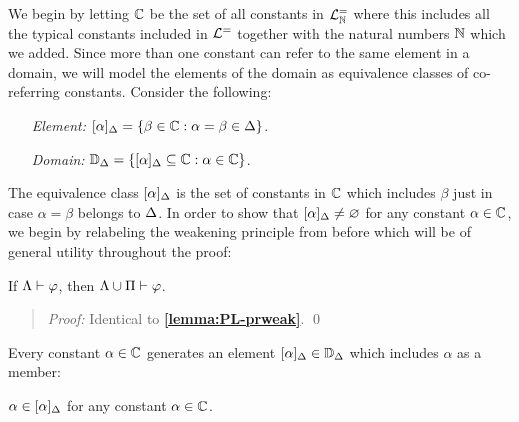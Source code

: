 We begin by letting $\mathbb{C}$ be the set of all constants in $\mathcal{L}^{=}_{\mathbb{N}}$ where this includes all the typical constants included in $\mathcal{L}^{=}$ together with the natural numbers $\mathbb{N}$ which we added. 
Since more than one constant can refer to the same element in a domain, we will model the elements of the domain as equivalence classes of co-referring constants.
Consider the following:
  \begin{enumerate}[leftmargin=1.5in]
    \item[\it Element:] $[\alpha]_{\Delta}=\lbrace\beta\in\mathbb{C} : \alpha=\beta\in\Delta\rbrace$.
    \item[\it Domain:] $\mathbb{D}_{\Delta}=\lbrace[\alpha]_{\Delta} \subseteq \mathbb{C} : \alpha\in\mathbb{C}\rbrace$.
  \end{enumerate}
The equivalence class $[\alpha]_{\Delta}$ is the set of constants in $\mathbb{C}$ which includes $\beta$ just in case $\alpha=\beta$ belongs to $\Delta$.
In order to show that $[\alpha]_{\Delta}\neq\varnothing$ for any constant $\alpha\in\mathbb{C}$, we begin by relabeling the weakening principle from before which will be of general utility throughout the proof:





\begin{Lthm} \label{lemma:FOL-prweak}
  If $\Lambda\vdash\varphi$, then $\Lambda\cup\Pi\vdash\varphi$.
\end{Lthm}

\begin{quote} 
  \textit{Proof:} 
  Identical to \textbf{\ref{lemma:PL-prweak}}.
  \qed
\end{quote}



Every constant $\alpha\in\mathbb{C}$ generates an element $[\alpha]_{\Delta}\in\mathbb{D}_{\Delta}$ which includes $\alpha$ as a member: 


\begin{Lthm} \label{lemma:FOL-nonempty}
  $\alpha\in[\alpha]_{\Delta}$ for any constant $\alpha\in\mathbb{C}$.
\end{Lthm}


